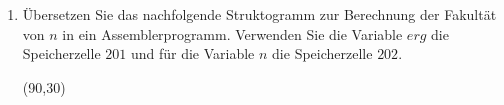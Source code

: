 \documentclass{bschlangaul-aufgabe}
\begin{document}
\begin{enumerate}
\item Übersetzen Sie das nachfolgende Struktogramm zur Berechnung der
Fakultät von $n$ in ein Assemblerprogramm. Verwenden Sie die Variable
$erg$ die Speicherzelle $201$ und für die Variable $n$ die Speicherzelle
$202$.

\begin{center}
\begin{struktogramm}(90,30)
\whileend
\end{struktogramm}
\end{center}

\begin{bAntwort}
\begin{multicols}{2}


\columnbreak


\end{multicols}
\bigskip
\end{bAntwort}
\end{enumerate}
\end{document}
